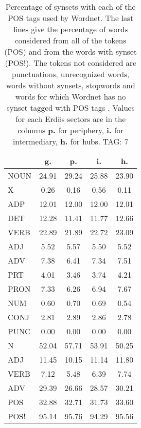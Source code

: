 \begin{table}[h!]
\begin{center}
\begin{tabular}{| l || c | c | c | c |}\hline
 & {\bf g.} & {\bf p.} & {\bf i.} & {\bf h.} \\\hline\hline
NOUN & 24.91  & 29.24  & 25.88  & 23.90 \\
X & 0.26  & 0.16  & 0.56  & 0.11 \\\hline
ADP & 12.01  & 12.00  & 12.00  & 12.01 \\
DET & 12.28  & 11.41  & 11.77  & 12.66 \\\hline
VERB & 22.89  & 21.89  & 22.72  & 23.09 \\\hline
ADJ & 5.52  & 5.57  & 5.50  & 5.52 \\
ADV & 7.38  & 6.41  & 7.34  & 7.51 \\\hline
PRT & 4.01  & 3.46  & 3.74  & 4.21 \\
PRON & 7.33  & 6.26  & 6.94  & 7.67 \\
NUM & 0.60  & 0.70  & 0.69  & 0.54 \\
CONJ & 2.81  & 2.89  & 2.86  & 2.78 \\
PUNC & 0.00  & 0.00  & 0.00  & 0.00 \\\hline\hline\hline
N & 52.04  & 57.71  & 53.91  & 50.25 \\\hline
ADJ & 11.45  & 10.15  & 11.14  & 11.80 \\\hline
VERB & 7.12  & 5.48  & 6.39  & 7.74 \\\hline
ADV & 29.39  & 26.66  & 28.57  & 30.21 \\\hline\hline
POS & 32.88  & 32.71  & 31.73  & 33.60 \\\hline
POS! & 95.14  & 95.76  & 94.29  & 95.56 \\\hline
\end{tabular}
\caption{Percentage of synsets with each of the POS tags used by Wordnet. The last lines give the percentage of words considered from all of the tokens (POS) and from the words with synset (POS!). The tokens not considered are punctuations, unrecognized words, words without synsets, stopwords and words for which Wordnet has no synset  tagged with POS tags . Values for each Erd\"os sectors are in the columns {{\bf p.}} for periphery, {{\bf i.}} for intermediary, {{\bf h.}} for hubs. TAG: 7}
\end{center}
\end{table}
